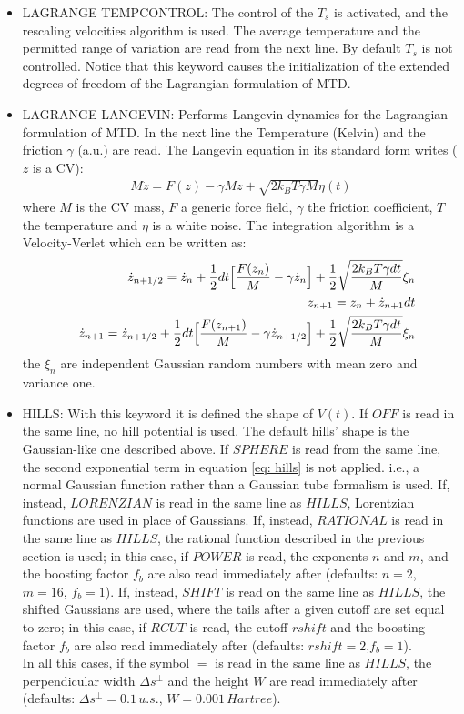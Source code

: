\documentclass[twoside,10pt,titlepage,a4paper]{article}
\begin{document}
\begin{itemize}
\item{LAGRANGE TEMPCONTROL:} The control of the $T_s$ is activated,
and the rescaling velocities algorithm is used.
The average temperature and the permitted range of variation are
read from the next line. By default $T_s$ is not controlled.
Notice that this keyword causes the initialization of the extended degrees of freedom of the Lagrangian formulation of MTD. 

\item{LAGRANGE LANGEVIN:} Performs Langevin dynamics for the Lagrangian 
formulation of MTD. In the next line the Temperature (Kelvin) and the
friction $\gamma$ (a.u.) are read. The Langevin equation in its standard 
form writes ($z$ is a CV): 
\begin{eqnarray}
M\ddot z=F(z)-\gamma M \dot z+\sqrt{2k_BT\gamma M}\eta(t) 
\end{eqnarray}
where $M$ is the CV mass, $F$ a generic force field, $\gamma$ the friction
coefficient, $T$ the temperature and $\eta$ is a white noise. The integration
algorithm is a Velocity-Verlet which can be written as:
\begin{eqnarray}
& & \dot z_{n+1/2}=\dot z_n+{1\over 2}dt\Big[{F(z_n)\over M}-\gamma\dot z_n\Big]+{1\over2}\sqrt{2k_BT\gamma dt\over M}\xi_n\nonumber \\
& & z_{n+1}=z_n+\dot z_{n+1}dt\nonumber \\
& & \dot z_{n+1}=\dot z_{n+1/2}+{1\over 2}dt\Big[{F(z_{n+1})\over M}-\gamma\dot z_{n+1/2}\Big]+{1\over2}\sqrt{2k_BT\gamma dt\over M}\xi_n
\end{eqnarray}
the $\xi_n$ are independent Gaussian random numbers with mean zero and 
variance one.

\item{HILLS:} With this keyword it is defined the shape of $V(t)$.
If $OFF$ is read in the same line, no hill potential is used.
The default hills' shape is the Gaussian-like one described above.
If $SPHERE$ is read from the same line, the second exponential term in equation \ref{eq: hills}
is not applied. i.e., a normal Gaussian function rather than a Gaussian tube formalism is used.
If, instead, $LORENZIAN$ is read in the same line as $HILLS$,
Lorentzian functions are used in place of Gaussians. If, instead,
$RATIONAL$ is read in the same line as $HILLS$, the rational function
described in the previous section is used; in this case, if $POWER$ is read,
the exponents $n$ and $m$, and the boosting factor $f_b$ are also
read immediately after (defaults: $n=2$, $m=16$, $f_b=1$).
If, instead, $SHIFT$ is read on the same line as $HILLS$,
the shifted Gaussians are used, where the tails after a given
cutoff are set equal to zero; in this case, if $RCUT$ is read,
the cutoff $rshift$ and the boosting factor $f_b$ are also read
immediately after (defaults: $rshift = 2$,$f_b=1$). \\
In all this cases, if the symbol $=$ is read in the same
line as $HILLS$, the perpendicular width $\Delta s^{\perp}$
and the height $W$ are read immediately after (defaults:
$\Delta s^{\perp} = 0.1 \, u.s.$, $W = 0.001 \, Hartree$).


\end{itemize}
\end{document}
